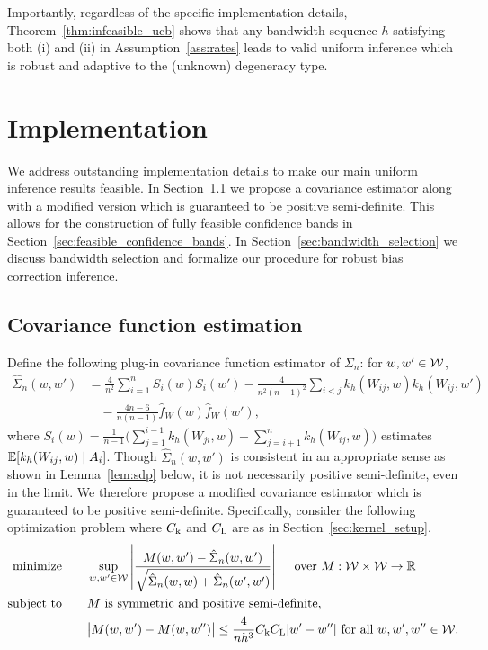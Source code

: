 Importantly, regardless of the specific implementation details,
Theorem~\ref{thm:infeasible_ucb} shows that any bandwidth sequence $h$
satisfying both (i) and (ii)
in Assumption~\ref{ass:rates} leads to valid uniform inference which is robust
and adaptive to the (unknown) degeneracy type.

\section{Implementation}\label{sec:implementation}

We address outstanding implementation details to make our main
uniform inference results feasible.
In Section~\ref{sec:covariance_estimation} we propose a covariance estimator
along with a modified version which is guaranteed to be positive semi-definite.
This allows for the construction of fully feasible confidence bands
in Section~\ref{sec:feasible_confidence_bands}.
In Section~\ref{sec:bandwidth_selection} we discuss bandwidth selection
and formalize our procedure for
robust bias correction inference.

\subsection{Covariance function estimation}
\label{sec:covariance_estimation}

Define the following plug-in covariance function
estimator of $\Sigma_n$: for $w, w' \in \mathcal{W}$,
%
\begin{align*}
  \hat \Sigma_n(w,w')
  &=
  \frac{4}{n^2}
  \sum_{i=1}^n
  S_i(w) S_i(w')
  -
  \frac{4}{n^2(n-1)^2}
  \sum_{i<j}
  k_h(W_{i j},w)
  k_h(W_{i j},w') \\
  &\quad-
  \frac{4n-6}{n(n-1)}
  \hat f_W(w)
  \hat f_W(w'),
\end{align*}
%
where
$S_i(w) = \frac{1}{n-1} \big( \sum_{j = 1}^{i-1} k_h(W_{j i}, w)
+ \sum_{j = i+1}^n k_h(W_{i j}, w) \big)$
estimates $\mathbb{E}[k_h(W_{i j},w) \mid A_i]$.
Though $\hat\Sigma_n(w,w')$ is consistent in an appropriate sense
as shown in Lemma~\ref{lem:sdp} below,
it is not necessarily positive semi-definite,
even in the limit.
We therefore propose a modified covariance estimator
which is guaranteed to be positive semi-definite.
Specifically, consider the following optimization problem
where $C_{\mathrm{k}}$ and $C_{\mathrm{L}}$ are as in Section~\ref{sec:kernel_setup}.
%
\begin{equation}
  \label{eq:sdp}
  \begin{aligned}
    \operatorname*{minimize}
    \qquad
    & \sup_{w,w' \in \mathcal{W}}
    \left|
    \frac{M(w,w') - \hat\Sigma_n(w,w')}
    {\sqrt{\hat \Sigma_n(w,w) + \hat \Sigma_n(w',w')}}
    \right|
    \quad \textup{ over } M: \mathcal{W} \times \mathcal{W} \to \mathbb{R}
    \\
    \operatorname*{subject\ to}
    \qquad
    & M \textup{ is symmetric and positive semi-definite}, \\
    & \big|M(w,w') - M(w, w'')\big|
    \leq \frac{4}{n h^3}
    C_{\mathrm{k}} C_{\mathrm{L}}
    |w'-w''|
    \textup{ for all }
    w, w', w'' \in \mathcal{W}.
  \end{aligned}
\end{equation}

